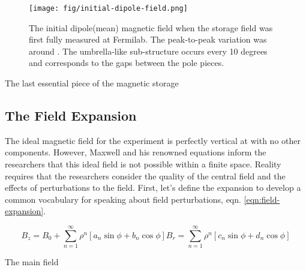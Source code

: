 \begin{figure}
\texttt{[image: fig/initial-dipole-field.png]}
\caption{The initial dipole(mean) magnetic field when the storage field was first fully measured at Fermilab.  The peak-to-peak variation was around .  The umbrella-like sub-structure occurs every 10 degrees and corresponds to the gaps between the pole pieces.}
\label{fig:initial-field}
\end{figure}

The last essential piece of the magnetic storage

\subsection{The Field Expansion}

The ideal magnetic field for the experiment is perfectly vertical at \bmagic with no other components.  However, Maxwell and his renowned equations inform the researchers that this ideal field is not possible within a finite space.  Reality requires that the researchers consider the quality of the central field and the effects of perturbations to the field.  First, let's define the expansion to develop a common vocabulary for speaking about field perturbations, eqn. \ref{eqn:field-expansion}.

\begin{equation}
B_z = B_0 + \sum_{n=1}^{\infty} \rho^n[a_n \sin{\phi} + b_n \cos{\phi}]
B_r = \sum_{n=1}^{\infty} \rho^n[c_n \sin{\phi} + d_n \cos{\phi}]
\label{eqn:field-expansion}
\end{equation}

The main field






